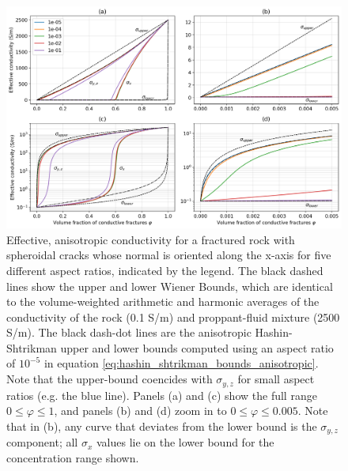 \begin{figure}
    \begin{center}
    \includegraphics[width=\columnwidth]{figures/phys_prop_model/aligned_fractures.png}
    \end{center}
\caption{
    Effective, anisotropic conductivity for a fractured rock with spheroidal
    cracks whose normal is oriented along the x-axis for five different aspect ratios, indicated by the legend.
    The black dashed lines show the upper and lower
    Wiener Bounds, which are identical to the volume-weighted arithmetic and harmonic averages of the
    conductivity of the rock (0.1 S/m) and proppant-fluid mixture (2500 S/m). The black dash-dot lines
    are the anisotropic Hashin-Shtrikman upper and lower bounds computed using an aspect ratio of $10^{-5}$ in
    equation \ref{eq:hashin_shtrikman_bounds_anisotropic}. Note that the upper-bound coencides with $\sigma_{y, z}$ for small aspect ratios (e.g. the blue line).
    Panels (a) and (c) show the
    full range $0 \leq \varphi \leq 1$, and panels (b) and (d) zoom in to $0 \leq \varphi \leq 0.005$.
    Note that in (b), any curve that deviates from the lower bound is the $\sigma_{y, z}$ component;
    all $\sigma_x$ values lie on the lower bound for the concentration range shown.
}
\label{fig:aligned_fractures}
\end{figure}
